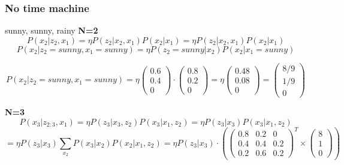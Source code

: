 \documentclass{article}
\begin{document}
\subsubsection{No time machine}
sunny, sunny, rainy
\textbf{N=2}
$$P(x_2|z_2, x_1) =  \eta P(z_2|x_2, x_1)P(x_2|x_1) = \eta P(z_2|x_2, x_1)P(x_2|x_1) $$
$$P(x_2|z_2=sunny, x_1=sunny) =\eta P(z_2=sunny|x_2)P(x_2|x_1=sunny) $$

$$P(x_2|z_2=sunny, x_1=sunny) =\eta \begin{pmatrix}
0.6 \\
 0.4 \\ 
 0
\end{pmatrix} \cdot \begin{pmatrix}
0.8 \\ 0.2 \\ 0
\end{pmatrix} = \eta \begin{pmatrix}
0.48 \\ 0.08 \\0
\end{pmatrix}  = \begin{pmatrix}
8/9 \\ 1/9 \\ 0
\end{pmatrix} $$

\textbf{N=3}
$$P(x_3|z_{2:3}, x_1) =  \eta P(z_3|x_3,z_2)P(x_3|x_1,z_2) = \eta P(z_3|x_3)P(x_3|x_1,z_2) $$
$$= \eta P(z_3|x_3) \sum_{x_2}P(x_3|x_2) P(x_2|x_1,z_2) =\eta P(z_3|x_3)\cdot
(\begin{pmatrix}
0.8 & 0.2 & 0 \\
0.4 & 0.4 & 0.2 \\
0.2 & 0.6 & 0.2
\end{pmatrix}^T \times  \begin{pmatrix}
8 \\ 1 \\ 0
\end{pmatrix}) $$
\end{document}
